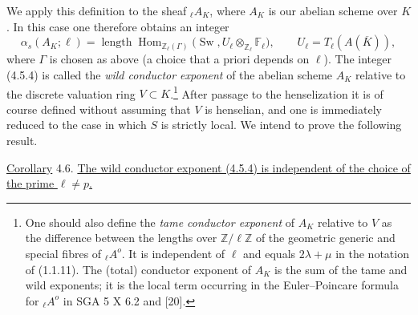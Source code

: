 We apply this definition to the sheaf ${}_\ell A_K$, where $A_K$ is our
abelian scheme over $K$.  In this case one therefore obtains an integer
\begin{equation}\tag{4.5.4}
 \alpha_s(A_K;\ell)
 =\operatorname{length}
   \operatorname{Hom}_{\mathbb Z_\ell(\Gamma)}
   \bigl(\operatorname{Sw},
         U_\ell\otimes_{\mathbb Z_\ell}\mathbb F_\ell\bigr),
 \qquad
 U_\ell=T_\ell(A(\overline K)),
\end{equation}
where $\Gamma$ is chosen as above (a choice that a priori depends on
$\ell$).  The integer (4.5.4) is called the \emph{wild conductor
exponent} of the abelian scheme $A_K$ relative to the discrete valuation
ring $V\subset K$.\footnote{One should also define the \emph{tame
conductor exponent} of $A_K$ relative to $V$ as the difference between
the lengths over $\mathbb Z/\ell\mathbb Z$ of the geometric generic and
special fibres of ${}_\ell A^o$.  It is independent of $\ell$ and equals
$2\lambda+\mu$ in the notation of (1.1.11).  The (total) conductor
exponent of $A_K$ is the sum of the tame and wild exponents; it is the
local term occurring in the Euler--Poincare formula for ${}_\ell A^o$ in
SGA 5 X 6.2 and [20].}  After passage to the henselization it is of
course defined without assuming that $V$ is henselian, and one is
immediately reduced to the case in which $S$ is strictly local.  We
intend to prove the following result.

\medskip
\noindent
\underline{Corollary} 4.6. \underline{The wild conductor exponent
(4.5.4) is independent of the choice of the prime $\ell\neq p$.}


